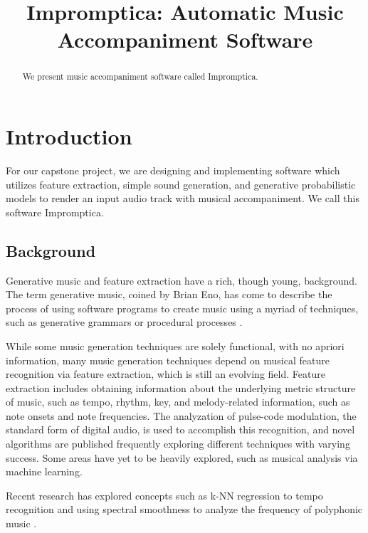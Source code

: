 \documentclass[11pt,conference,letterpaper]{IEEEtran}
\begin{document}
\title{Impromptica: Automatic Music Accompaniment Software}
\author{}

\maketitle

\begin{abstract}
We present music accompaniment software called Impromptica.
\end{abstract}

\section{Introduction}

For our capstone project, we are designing and implementing software which utilizes feature extraction, simple sound generation, and generative probabilistic models to render an input audio track with musical accompaniment. We call this software Impromptica.

\subsection{Background}

Generative music and feature extraction have a rich, though young, background. The term generative music, coined by Brian Eno, has come to describe the process of using software programs to create music using a myriad of techniques, such as generative grammars or procedural processes \cite{wooller2005framework}. 

While some music generation techniques are solely functional, with no apriori information, many music generation techniques depend on musical feature recognition via feature extraction, which is still an evolving field. Feature extraction includes obtaining information about the underlying metric structure of music, such as tempo, rhythm, key, and melody-related information, such as note onsets and note frequencies. The analyzation of pulse-code modulation, the standard form of digital audio, is used to accomplish this recognition, and novel algorithms are published frequently exploring different techniques with varying success. Some areas have yet to be heavily explored, such as musical analysis via machine learning.

Recent research has explored concepts such as k-NN regression to tempo recognition \cite{eronen2010music} and using spectral smoothness to analyze the frequency of polyphonic music \cite{klapuri2003multiple}.
\end{document}
